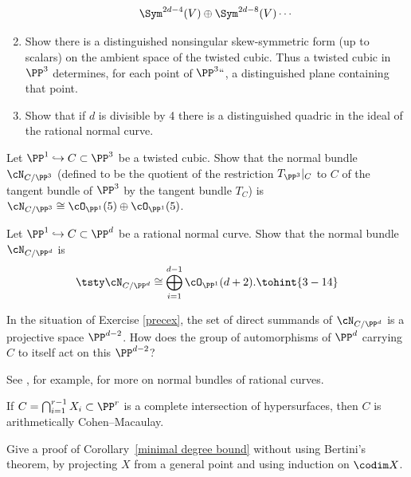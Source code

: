 \begin{exercise}
\begin{enumerate}
 $$
 \Sym^{2d-4}(V)\oplus \Sym^{2d-8}(V) \cdots
 $$
  \item Show  there is a distinguished nonsingular
%
%
skew-symmetric form (up to scalars) on the ambient space of the twisted cubic.
Thus a twisted cubic in $\PP^3$ determines, for each point of $\PP^3` `$, a distinguished plane containing that point.
 \item Show that if $d$ is divisible by 4 there is a distinguished quadric in the ideal of the rational normal curve.
\end{enumerate}
\end{exercise}

\begin{exercise}\label{Normal bundle of cubic}
Let $\PP^1 \hookrightarrow C \subset \PP^3$ be a
twisted cubic.
%
Show that the normal bundle
%
$\cN_{C/\PP^3}$ (defined to be the quotient of the restriction
$T_{\PP^3}|_C$ to $C$ of the tangent bundle  of $\PP^3$  by the
tangent bundle $T_C$) is
$\cN_{C/\PP^3} \cong \cO_{\PP^1}(5) \oplus  \cO_{\PP^1}(5)$.
\end{exercise}

\begin{exercise}
Let $\PP^1 \hookrightarrow C \subset \PP^d$ be a rational normal
%
curve. Show that the
normal bundle
%
$\cN_{C/\PP^d}$  is
\label{precex}
$$
\tsty
\cN_{C/\PP^d} \cong \bigoplus\limits_{i=1}^{d-1} \cO_{\PP^1}(d+2).
\tohint{3-14}
$$
\end{exercise}

\begin{exercise}
In the situation of
Exercise \ref{precex},
the set  of direct summands
of $\cN_{C/\PP^d} $ is a projective space $\PP^{d-2}$. How does the
group of automorphisms of $\PP^d$ carrying $C$ to itself act on this $\PP^{d-2}$?
\end{exercise}

See \cite{MR3778979}, for example,
%
%
for more on normal bundles of rational curves.

\begin{exercise}\label{ci is acm}
If $C=\bigcap_{i = 1}^{r-1}X_i \subset \PP^r$ is a
%
complete intersection
 of hypersurfaces,
then $C$ is
%
arithmetically Cohen--Macaulay.
\end{exercise}

\begin{exercise}
Give a proof of Corollary~\ref{minimal degree bound} without using
Bertini's theorem, by projecting $X$ from a general point and using
induction on $\codim X$.
\end{exercise}


